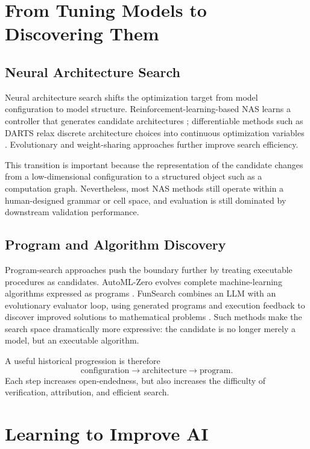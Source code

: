 \documentclass[journal]{IEEEtran}
\begin{document}
\section{From Tuning Models to Discovering Them}
\label{sec:discovery}

\subsection{Neural Architecture Search}
Neural architecture search shifts the optimization target from model configuration to model structure. Reinforcement-learning-based NAS learns a controller that generates candidate architectures \cite{zoph2017nas}; differentiable methods such as DARTS relax discrete architecture choices into continuous optimization variables \cite{liu2019darts}. Evolutionary and weight-sharing approaches further improve search efficiency.

This transition is important because the representation of the candidate changes from a low-dimensional configuration to a structured object such as a computation graph. Nevertheless, most NAS methods still operate within a human-designed grammar or cell space, and evaluation is still dominated by downstream validation performance.

\subsection{Program and Algorithm Discovery}
Program-search approaches push the boundary further by treating executable procedures as candidates. AutoML-Zero evolves complete machine-learning algorithms expressed as programs \cite{real2020automlzero}. FunSearch combines an LLM with an evolutionary evaluator loop, using generated programs and execution feedback to discover improved solutions to mathematical problems \cite{romeraparedes2024funsearch}. Such methods make the search space dramatically more expressive: the candidate is no longer merely a model, but an executable algorithm.

A useful historical progression is therefore
\begin{equation*}
\text{configuration} \rightarrow \text{architecture} \rightarrow \text{program}.
\end{equation*}
Each step increases open-endedness, but also increases the difficulty of verification, attribution, and efficient search.

\section{Learning to Improve AI}
\label{sec:meta}
\end{document}
